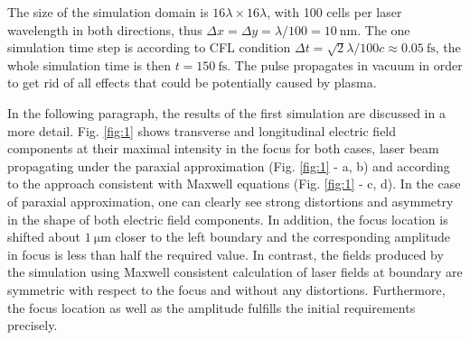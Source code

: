 The size of the simulation domain is $ 16 \lambda \times 16 \lambda $, with 100 cells per laser wavelength in both directions, thus $ \Delta x = \Delta y = \lambda/100 = 10 \: \mathrm{nm} $. The one simulation time step is according to CFL condition $ \Delta t = \sqrt{2} \lambda/ 100 c \approx 0.05 \: \mathrm{fs} $, the whole simulation time is then $ t = 150 \: \mathrm{fs} $. The pulse propagates in vacuum in order to get rid of all effects that could be potentially caused by plasma.

In the following paragraph, the results of the first simulation are discussed in a more detail. Fig. \ref{fig:1} shows transverse and longitudinal electric field components at their maximal intensity in the focus for both cases, laser beam propagating under the paraxial approximation (Fig. \ref{fig:1} - a, b) and according to the approach consistent with Maxwell equations (Fig. \ref{fig:1} - c, d). In the case of paraxial approximation, one can clearly see strong distortions and asymmetry in the shape of both electric field components. In addition, the focus location is shifted about $ 1 \: \mathrm{\mu m} $ closer to the left boundary and the corresponding amplitude in focus is less than half the required value. In contrast, the fields produced by the simulation using Maxwell consistent calculation of laser fields at boundary are symmetric with respect to the focus and without any distortions. Furthermore, the focus location as well as the amplitude fulfills the initial requirements precisely.

